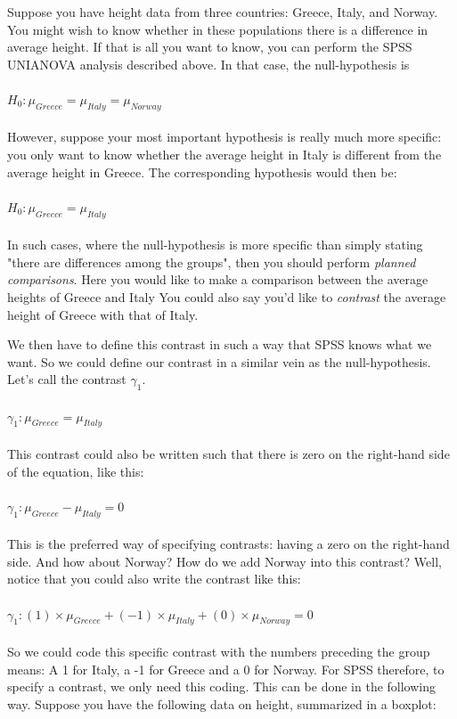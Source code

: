 \documentclass[]{report}\usepackage[]{graphicx}\usepackage[]{color}
\begin{document}
Suppose you have height data from three countries: Greece, Italy, and Norway. You might wish to know whether in these populations there is a difference in average height. If that is all you want to know, you can perform the SPSS UNIANOVA analysis described above. In that case, the null-hypothesis is
\\
\\
$H_0: \mu_{Greece}=\mu_{Italy}=\mu_{Norway}$
\\
\\
However, suppose your most important hypothesis is really much more specific: you only want to know whether the average height in Italy is different from the average height in Greece. The corresponding hypothesis would then be: 
\\
\\
$H_0: \mu_{Greece}=\mu_{Italy}$
\\
\\
In such cases, where the null-hypothesis is more specific than simply stating "there are differences among the groups", then you should perform \textit{planned comparisons}. Here you would like to make a comparison between the average heights of Greece and Italy You could also say you'd like to \textit{contrast} the average height of Greece with that of Italy. 

We then have to define this contrast in such a way that SPSS knows what we want. So we could define our contrast in a similar vein as the null-hypothesis. Let's call the contrast $\gamma_1$.
\\
\\
$\gamma_1: \mu_{Greece}=\mu_{Italy}$
\\
\\

This contrast could also be written such that there is zero on the right-hand side of the equation, like this:
\\
\\
$\gamma_1: \mu_{Greece}-\mu_{Italy}=0$
\\
\\
This is the preferred way of specifying contrasts: having a zero on the right-hand side. And how about Norway? How do we add Norway into this contrast? Well, notice that you could also write the contrast like this:
\\
\\
$\gamma_1: (1)\times \mu_{Greece} + (-1) \times \mu_{Italy} + (0) \times \mu_{Norway} =0$
\\
\\
So we could code this specific contrast with the numbers preceding the group means: A 1 for Italy, a -1 for Greece and a 0 for Norway. For SPSS therefore, to specify a contrast, we only need this coding. This can be done in the following way. Suppose you have the following data on height, summarized in a boxplot:
\end{document}
